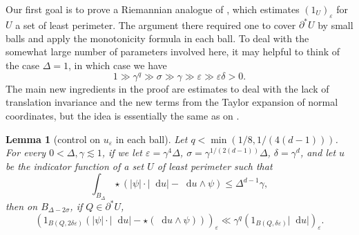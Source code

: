 \documentclass[reqno,10pt]{amsart}
\newcommand*\dif{\mathop{}\!\mathrm{d}}
\newtheorem{lemma}[theorem]{Lemma}
\theoremstyle{definition}
\numberwithin{equation}{section}
\begin{document}
Our first goal is to prove a Riemannian analogue of \cite[Theorem 7.3]{Giusti77}, which estimates $(1_U)_\varepsilon$ for $U$ a set of least perimeter.
The argument there required one to cover $\partial^* U$ by small balls and apply the monotonicity formula in each ball.
To deal with the somewhat large number of parameters involved here, it may helpful to think of the case $\Delta = 1$, in which case we have
$$1 \gg \gamma^q \gg \sigma \gg \gamma \gg \varepsilon \gg \varepsilon \delta > 0.$$
The main new ingredients in the proof are estimates to deal with the lack of translation invariance and the new terms from the Taylor expansion of normal coordinates, but the idea is essentially the same as on \cite[pg89--92]{Giusti77}.

\begin{lemma}[control on $u_\varepsilon$ in each ball]\label{mollifier sublemma}
Let $q < \min(1/8, 1/(4(d - 1)))$.
For every $0 < \Delta, \gamma \lesssim 1$, if we let $\varepsilon = \gamma^4 \Delta$, $\sigma = \gamma^{1/(2(d - 1))} \Delta$, $\delta = \gamma^d$, and let $u$ be the indicator function of a set $U$ of least perimeter such that
\begin{equation}\label{hypothesis on mollifier sublemma}
\int_{B_\Delta} \star(|\psi| \cdot |\dif u| - \dif u \wedge \psi) \leq \Delta^{d - 1} \gamma,
\end{equation}
then on $B_{\Delta - 2\sigma}$, if $Q \in \partial^* U$,
$$(1_{B(Q, 2\delta\varepsilon)}(|\psi| \cdot |\dif u| - \star(\dif u \wedge \psi)))_\varepsilon \ll \gamma^q (1_{B(Q, \delta\varepsilon)} |\dif u|)_\varepsilon.$$
\end{lemma}
\end{document}
